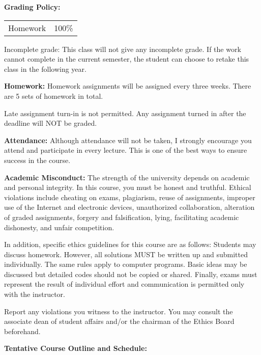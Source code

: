 \documentclass[a4paper,10pt]{article}
\begin{document}
\textbf{Grading Policy:}

\begin{tabular}{lr}
Homework & 100\%\\ 
\end{tabular}

Incomplete grade: This class will not give any
incomplete grade. If the work cannot complete in the
current semester, the student can choose to retake this
class in the following year.






\textbf{Homework:} Homework assignments will be assigned every three weeks. There are 5 sets of homework in total. 

Late assignment turn-in is not permitted. Any assignment turned in after the deadline will NOT be graded.




\textbf{Attendance:} Although attendance will not be taken, I strongly encourage you attend and participate in every lecture. This is one of the best ways to ensure success in the course.






\textbf{Academic Misconduct:} The strength of the university depends on academic and personal integrity. In this course, you must be honest 
and truthful. Ethical violations include cheating on exams, plagiarism, reuse of assignments, improper use 
of the Internet and electronic devices, unauthorized collaboration, alteration of graded assignments, forgery 
and falsification, lying, facilitating academic dishonesty, and unfair competition.

In addition, specific ethics guidelines for this course are as follows: Students may discuss homework. However, 
all solutions MUST be written up and submitted individually. The same rules apply to computer programs. 
Basic ideas may be discussed but detailed codes should not be copied or shared. Finally, exams must 
represent the result of individual effort and communication is permitted only with the instructor.

Report any violations you witness to the instructor. You may consult the associate dean of student affairs 
and/or the chairman of the Ethics Board beforehand. 

\textbf{Tentative Course Outline and Schedule:}
\end{document}
